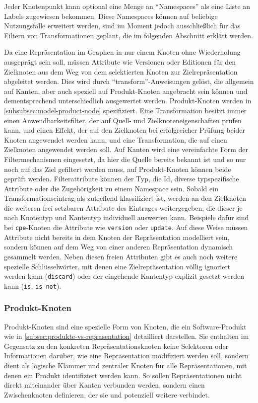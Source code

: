 Jeder Knotenpunkt kann optional eine Menge an \enquote{Namespaces} als eine Liste an Labels zugewiesen bekommen.
Diese Namespaces können auf beliebige Nutzungsfälle erweitert werden, sind im Moment jedoch ausschließlich für das Filtern von Transformationen geplant, die im folgenden Abschnitt erklärt werden.

Da eine Repräsentation im Graphen in nur einem Knoten ohne Wiederholung ausgeprägt sein soll, müssen Attribute wie Versionen oder Editionen für den Zielknoten aus dem Weg von dem selektierten Knoten zur Zielrepräsentation abgeleitet werden.
Dies wird durch \enquote{transform}-Anweisungen gelöst, die allgemein auf Kanten, aber auch speziell auf Produkt-Knoten angebracht sein können und dementsprechend unterschiedlich ausgewertet werden.
Produkt-Knoten werden in \autoref{subsubsec:model-product-node} spezifiziert.
Eine Transformation besitzt immer einen Anwendbarkeitsfilter, der auf Quell- und Zielknoteneigenschaften prüfen kann, und einen Effekt, der auf den Zielknoten bei erfolgreicher Prüfung beider Knoten angewendet werden kann, und eine Transformation, die auf einen Zielknoten angewendet werden soll.
Auf Kanten wird eine vereinfachte Form der Filtermechanismen eingesetzt, da hier die Quelle bereits bekannt ist und so nur noch auf das Ziel gefiltert werden muss, auf Produkt-Knoten können beide geprüft werden.
Filterattribute können der Typ, die Id, diverse typspezifische Attribute oder die Zugehörigkeit zu einem Namespace sein.
Sobald ein Transformationseintrag als zutreffend klassifiziert ist, werden an den Zielknoten die weiteren frei setzbaren Attribute des Eintrages weitergegeben, die dieser je nach Knotentyp und Kantentyp individuell auswerten kann.
Beispiele dafür sind bei \texttt{cpe}-Knoten die Attribute wie \texttt{version} oder \texttt{update}.
Auf diese Weise müssen Attribute nicht bereits in dem Knoten der Repräsentation modelliert sein, sondern können auf dem Weg von einer anderen Repräsentation dynamisch gesammelt werden.
Neben diesen freien Attributen gibt es auch noch weitere spezielle Schlüsselwörter, mit denen eine Zielrepräsentation völlig ignoriert werden kann (\texttt{discard}) oder der eingehende Kantentyp explizit gesetzt werden kann (\texttt{is}, \texttt{is not}).

\subsubsection{Produkt-Knoten}\label{subsubsec:model-product-node}
Produkt-Knoten sind eine spezielle Form von Knoten, die ein Software-Produkt wie in \autoref{subsec:produkte-vs-reprasentation} detailliert darstellen.
Sie enthalten im Gegensatz zu den konkreten Repräsentationsknoten keine Selektoren oder Informationen darüber, wie eine Repräsentation modifiziert werden soll, sondern dient als logische Klammer und zentraler Knoten für alle Repräsentationen, mit denen ein Produkt identifiziert werden kann.
So sollen Repräsentationen nicht direkt miteinander über Kanten verbunden werden, sondern einen Zwischenknoten definieren, der sie und potenziell weitere verbindet.

